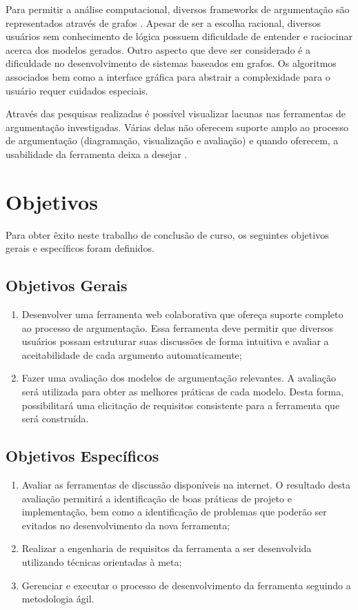 Para permitir a análise computacional, diversos frameworks de argumentação são representados através de grafos \cite{dung1995321} \cite{jureta2009AMA}. Apesar de ser a escolha racional, diversos usuários sem conhecimento de lógica possuem dificuldade de entender e raciocinar acerca dos modelos gerados. Outro aspecto que deve ser considerado é a dificuldade no desenvolvimento de sistemas baseados em grafos. Os algoritmos associados bem como a interface gráfica para abstrair a complexidade para o usuário requer cuidados especiais. 

Através das pesquisas realizadas é possível visualizar lacunas nas ferramentas de argumentação investigadas. Várias delas não oferecem suporte amplo ao processo de argumentação (diagramação, visualização e avaliação) e quando oferecem, a usabilidade da ferramenta deixa a desejar \cite{gonzalez2010usability}.

\section{Objetivos}

Para obter êxito neste trabalho de conclusão de curso, os seguintes objetivos gerais e específicos foram definidos.

\subsection{Objetivos Gerais}

\begin{enumerate}
\item Desenvolver uma ferramenta web colaborativa que ofereça suporte completo ao processo de argumentação. Essa ferramenta deve permitir que diversos usuários possam estruturar suas discussões de forma intuitiva e avaliar a aceitabilidade de cada argumento automaticamente;
\item Fazer uma avaliação dos modelos de argumentação relevantes. A avaliação será utilizada para obter as melhores práticas de cada modelo. Desta forma, possibilitará uma elicitação de requisitos consistente para a ferramenta que será construída.
\end{enumerate}

\subsection{Objetivos Específicos}

\begin{enumerate}
\item Avaliar as ferramentas de discussão disponíveis na internet. O resultado desta avaliação permitirá a identificação de boas práticas de projeto e implementação, bem como a identificação de problemas que poderão ser evitados no desenvolvimento da nova ferramenta;
\item Realizar a engenharia de requisitos da ferramenta a ser desenvolvida utilizando técnicas orientadas à meta;
\item Gerenciar e executar o processo de desenvolvimento da ferramenta seguindo a metodologia ágil.
\end{enumerate}

